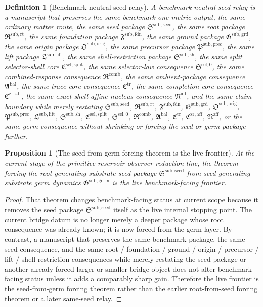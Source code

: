 \documentclass[11pt]{article}
\newcommand{\FoundationPackage}{\mathfrak F^{\mathrm{sub,fdn}}}
\newcommand{\GroundPackage}{\mathfrak G^{\mathrm{sub,grd}}}
\newcommand{\OriginPackage}{\mathfrak O^{\mathrm{sub,orig}}}
\newcommand{\PrecursorPackage}{\mathfrak P^{\mathrm{sub,prec}}}
\newcommand{\LiftPackage}{\mathfrak L^{\mathrm{sub,lift}}}
\newcommand{\ShellRestriction}{\mathfrak S^{\mathrm{sub,sh}}}
\newcommand{\SelectorCore}{\mathfrak C^{\mathrm{sel,split}}}
\newcommand{\SelectorLaw}{\mathfrak S^{\mathrm{sel},0}}
\newcommand{\CombinedLaw}{\mathfrak R^{\mathrm{comb}}}
\newcommand{\AmbientPackage}{\mathfrak A^{\mathrm{bal}}}
\newcommand{\TraceCore}{\mathfrak C^{\mathrm{tr}}}
\newcommand{\CompletionCore}{\mathfrak C^{\mathrm{zr,aff}}}
\newcommand{\AffineNucleus}{\mathfrak N^{\mathrm{aff}}}
\newcommand{\RootPackage}{\mathfrak R^{\mathrm{sub,rt}}}
\newcommand{\SeedPackage}{\mathfrak S^{\mathrm{sub,seed}}}
\newcommand{\GermPackage}{\mathfrak G^{\mathrm{sub,germ}}}
\newtheorem{definition}{Definition}
\newtheorem{proposition}{Proposition}
\begin{document}
\begin{definition}[Benchmark-neutral seed relay]
A \emph{benchmark-neutral seed relay} is a manuscript that preserves the same benchmark one-metric output, the same ordinary matter route, the same seed package \(\SeedPackage\), the same root package \(\RootPackage\), the same foundation package \(\FoundationPackage\), the same ground package \(\GroundPackage\), the same origin package \(\OriginPackage\), the same precursor package \(\PrecursorPackage\), the same lift package \(\LiftPackage\), the same shell-restriction package \(\ShellRestriction\), the same split selector-shell core \(\SelectorCore\), the same selector-law consequence \(\SelectorLaw\), the same combined-response consequence \(\CombinedLaw\), the same ambient-package consequence \(\AmbientPackage\), the same trace-core consequence \(\TraceCore\), the same completion-core consequence \(\CompletionCore\), the same exact-shell affine nucleus consequence \(\AffineNucleus\), and the same claim boundary while merely restating \(\SeedPackage\), \(\RootPackage\), \(\FoundationPackage\), \(\GroundPackage\), \(\OriginPackage\), \(\PrecursorPackage\), \(\LiftPackage\), \(\ShellRestriction\), \(\SelectorCore\), \(\SelectorLaw\), \(\CombinedLaw\), \(\AmbientPackage\), \(\TraceCore\), \(\CompletionCore\), \(\AffineNucleus\), or the same germ consequence without shrinking or forcing the seed or germ package further.
\end{definition}

\begin{proposition}[The seed-from-germ forcing theorem is the live frontier]
At the current stage of the primitive-reservoir observer-reduction line, the theorem forcing the root-generating substrate seed package \(\SeedPackage\) from seed-generating substrate germ dynamics \(\GermPackage\) is the live benchmark-facing frontier.
\end{proposition}

\begin{proof}
That theorem changes benchmark-facing status at current scope because it removes the seed package \(\SeedPackage\) itself as the live internal stopping point. The current bridge datum is no longer merely a deeper package whose root consequence was already known; it is now forced from the germ layer. By contrast, a manuscript that preserves the same benchmark package, the same seed consequence, and the same root / foundation / ground / origin / precursor / lift / shell-restriction consequences while merely restating the seed package or another already-forced larger or smaller bridge object does not alter benchmark-facing status unless it adds a comparably sharp gain. Therefore the live frontier is the seed-from-germ forcing theorem rather than the earlier root-from-seed forcing theorem or a later same-seed relay.
\end{proof}
\end{document}
